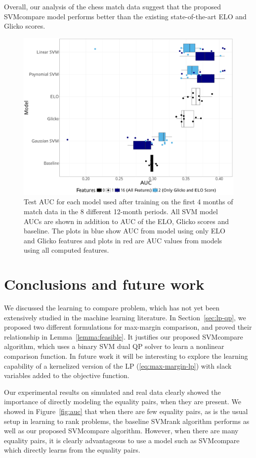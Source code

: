 \documentclass[twoside,11pt]{article}
\newcommand{\changed}[1]{
  #1
}
\begin{document}
Overall, our analysis of the chess match data suggest that the
proposed SVMcompare model performs better than the existing
state-of-the-art ELO and Glicko scores.

\begin{figure}[!b]
	\includegraphics[width=120mm]{AUC_chess.jpg}
	\centering
	\caption{Test AUC for each model used after training on the first 4 months of match data in the 8 different 12-month periods.  All SVM model AUCs are shown in addition to AUC of the ELO, Glicko scores and baseline.  The plots in blue show AUC from model using only ELO and Glicko features and plots in red are AUC values from models using all computed features.}
	\label{fig6}
\end{figure}

\section{Conclusions and future work}
\label{sec:conclusions}

We discussed the learning to compare problem, which has not yet been
extensively studied in the machine learning literature. In
Section~\ref{sec:lp-qp}, we proposed two different formulations for
max-margin comparison, and proved their relationship in
Lemma~\ref{lemma:feasible}. It justifies our proposed SVMcompare
algorithm, which uses a binary SVM dual QP solver to learn a nonlinear
comparison function. \changed{In future work it will be interesting to explore
the learning capability of a kernelized version of the LP
(\ref{eq:max-margin-lp}) with slack variables added to the objective
function.}

Our experimental results on simulated and real data clearly showed the
importance of directly modeling the equality pairs, when they are
present. We showed in Figure~\ref{fig:auc} that when there are few
equality pairs, as is the usual setup in learning to rank problems,
the baseline SVMrank algorithm performs as well as our proposed
SVMcompare algorithm. However, when there are many equality pairs, it
is clearly advantageous to use a model such as SVMcompare which
directly learns from the equality pairs.
\end{document}
